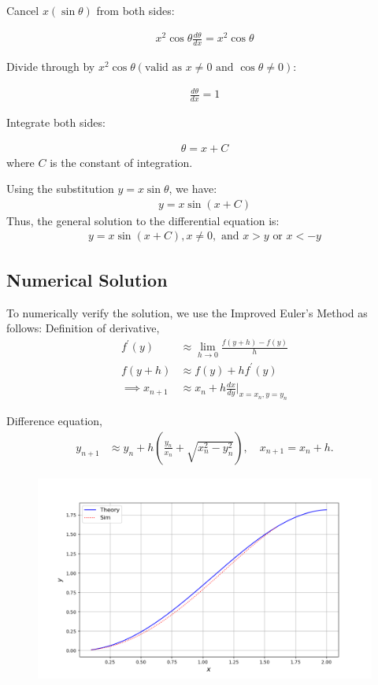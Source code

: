 \documentclass[journal]{IEEEtran}
\newcommand{\brak}[1]{\left( #1 \right)}
\begin{document}
Cancel $x \brak{\sin\theta}$ from both sides:

\begin{align}
    x^2 \cos\theta \frac{d\theta}{dx} = x^2 \cos\theta
\end{align}

Divide through by $x^2 \cos\theta \brak{\text{valid as } x \neq 0 \text{ and } \cos\theta \neq 0}$:

\begin{align}
    \frac{d\theta}{dx} = 1
\end{align}

Integrate both sides:

\begin{align}
    \theta = x + C
\end{align}
where $C$ is the constant of integration.

Using the substitution $y = x \sin\theta$, we have:
\begin{align}
  y = x \sin(x + C) 
\end{align}
Thus, the general solution to the differential equation is:
\begin{align}
    y = x \sin\brak{x + C},  x \neq 0, \text{ and } x > y \text{ or } x < -y
\end{align}

\subsection*{Numerical Solution}
To numerically verify the solution, we use the Improved Euler's Method as follows:
Definition of derivative,
\begin{align}
    f^\prime(y) &\approx \lim_{h\to0}\frac{f(y+h)-f(y)}{h} \\
    f(y+h) &\approx f(y)+hf^\prime(y) \\
    \implies x_{n+1} &\approx x_{n} + h\frac{dx}{dy}\Big|_{x=x_{n}, y=y_{n}}
\end{align}

Difference equation,
\begin{align}
    y_{n+1} &\approx y_n + h \left( \frac{y_n}{x_n} + \sqrt{x_n^2 - y_n^2} \right), \quad x_{n+1} = x_n + h.
\end{align}

\begin{figure}[h]
    \centering
    \includegraphics[width=\columnwidth]{figs/Figure_1.png}    
    \end{figure}
\end{document}
